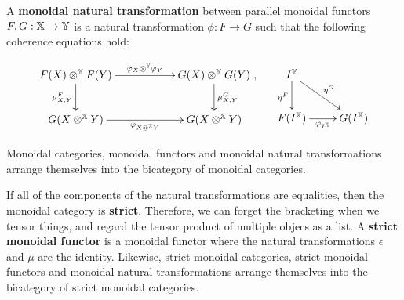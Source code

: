 \begin{definition}
A {\bf monoidal natural transformation} between parallel monoidal functors $F,G:\mathbb{X}\to \mathbb{Y}$ is a natural transformation $\phi:F\to G$ such that the following coherence equations hold:

$$
\xymatrix{
  F(X)\otimes^\Y F(Y) \ar[rr]^{\phi_X\otimes^\Y \phi_Y} \ar[d]_{\mu^F_{X,Y}}
   && G(X)\otimes^\Y G(Y) \ar[d]^{\mu^G_{X,Y}}
 \\G(X\otimes^\X Y) \ar[rr]_{\phi_{X\otimes^\X Y}}
   && G(X\otimes^\X Y)
},
\hspace*{.5cm}
\xymatrix{
I^\Y \ar[dr]^{\eta^G} \ar[d]_{\eta^F}
\\ F(I^\X) \ar[r]_{\phi_{I^\X}}
  &G(I^\X)
}
$$

Monoidal categories, monoidal functors and monoidal natural transformations arrange themselves into the bicategory of monoidal categories. 
\end{definition}








If all of the components of the natural transformations are equalities, then the monoidal category is {\bf strict}.  Therefore, we can forget the bracketing when we tensor things, and regard the tensor product of multiple objecs as a list.
A {\bf strict monoidal functor} is a monoidal functor where the natural transformations $\epsilon$ and $\mu$ are the identity.
Likewise, strict monoidal categories, strict monoidal functors and monoidal natural transformations arrange themselves into the bicategory of strict monoidal categories.




